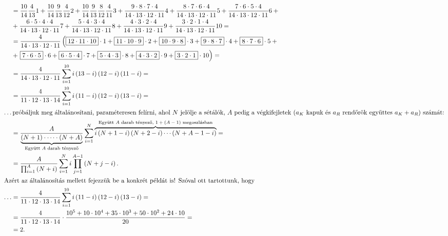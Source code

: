 \documentclass{article}
\newcommand{\parenthesed}[1]{\left(#1\right)}
\newcommand{\openparenthesed}[1]{\left(#1\right.}
\newcommand{\closeparenthesed}[1]{\left.#1\right)}
\begin{document}
\begin{align*}
		&= \frac{10}{14}\frac{4}{13}1 + \frac{10}{14}\frac{9}{13}\frac{4}{12}2 + \frac{10}{14}\frac{9}{13}\frac{8}{12}\frac{4}{11}3 + \frac{9\cdot8\cdot7\cdot4}{14\cdot13\cdot12\cdot11}4 + \frac{8\cdot7\cdot6\cdot4}{14\cdot13\cdot12\cdot11}5 + \frac{7\cdot6\cdot5\cdot4}{14\cdot13\cdot12\cdot11}6 {}+{}\\
		&+ \frac{6\cdot5\cdot4\cdot4}{14\cdot13\cdot12\cdot11}7 + \frac{5\cdot4\cdot3\cdot4}{14\cdot13\cdot12\cdot11}8 + \frac{4\cdot3\cdot2\cdot4}{14\cdot13\cdot12\cdot11}9 + \frac{3\cdot2\cdot1\cdot4}{14\cdot13\cdot12\cdot11}10 =\\
		&= \frac{4}{14\cdot13\cdot12\cdot11}\openparenthesed{\boxed{12\cdot11\cdot10}\cdot1 + \boxed{11\cdot10\cdot9}\cdot2 + \boxed{10\cdot9\cdot8}\cdot3 + \boxed{9\cdot8\cdot7}\cdot4 + \boxed{8\cdot7\cdot6}\cdot5 +{}}\\
		&+ \closeparenthesed{\boxed{7\cdot6\cdot5}\cdot6 + \boxed{6\cdot5\cdot4}\cdot7 + \boxed{5\cdot4\cdot3}\cdot8 + \boxed{4\cdot3\cdot2}\cdot9 + \boxed{3\cdot2\cdot1}\cdot10} =\\
		&= \frac{4}{14\cdot13\cdot12\cdot11}\sum_{i=1}^{10} i\parenthesed{13-i}\parenthesed{12-i}\parenthesed{11-i} =\\
		&= \frac{4}{11\cdot12\cdot13\cdot14}\sum_{i=1}^{10} i\parenthesed{11-i}\parenthesed{12-i}\parenthesed{13-i} =\\
		\intertext{\dots próbáljuk meg általánosítani, paraméteresen felírni, ahol $N$ jelölje a sétálók, $A$ pedig a végkifejletek ($a_K$ kapuk és $a_R$ rendőrök együttes $a_K + a_R$) számát:}
		&= \frac A{\underbrace{\parenthesed{N+1} \cdot \cdots \cdot \parenthesed{N+A}}_{\text{Együtt $A$ darab tényező}}}\sum_{i=1}^N \overbrace{i\parenthesed{N+1-i}\parenthesed{N+2-i}\cdots\parenthesed{N+A-1-i}}^{\text{Együtt $A$ darab tényező, $1 +\parenthesed{A-1}$ megoszlásban}} =\\
		&= \frac A{\prod_{i=1}^A\parenthesed{N+i}}\sum_{i=1}^N i\prod_{j=1}^{A-1}\parenthesed{N+j-i}.\\
		\intertext{Azért az általánosítás mellett fejezzük be a konkrét példát is! Szóval ott tartottunk, hogy}
		\dots &= \frac{4}{11\cdot12\cdot13\cdot14}\sum_{i=1}^{10} i\parenthesed{11-i}\parenthesed{12-i}\parenthesed{13-i} ={}\\
		&= \frac{4}{11\cdot12\cdot13\cdot14}\cdot\frac{10^5 + 10\cdot10^4 + 35\cdot10^3 +50\cdot10^2 + 24\cdot10}{20} =\\
		&= 2.
	\end{align*}
\end{document}
